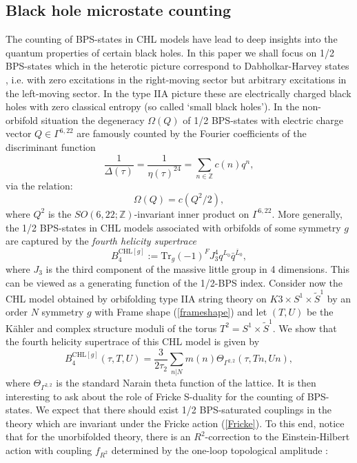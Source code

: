 \documentclass[a4paper,11pt]{article}
\numberwithin{equation}{section}
\def\be{\begin{equation}}
\def\ee{\end{equation}}
\begin{document}
\subsection{Black hole microstate counting}
The counting of BPS-states in CHL models have lead to deep insights into the quantum properties of certain black holes. In this paper we shall focus on 1/2 BPS-states which in the heterotic picture correspond to Dabholkar-Harvey states \cite{Dabholkar:1990yf}, i.e. with zero excitations in the right-moving sector but arbitrary excitations in the left-moving sector. In the type IIA picture these are electrically charged  black holes with zero classical entropy (so called `small black holes'). In the non-orbifold situation the degeneracy $\Omega(Q)$ of 1/2 BPS-states with electric charge vector $Q\in \Gamma^{6,22}$ are famously counted by the Fourier coefficients of the discriminant function 
\be
\frac{1}{\Delta(\tau)}=\frac{1}{\eta(\tau)^{24}} = \sum_{n\in \mathbb{Z}} c(n) q^{n},
\ee
via the relation:
\be
\Omega(Q) = c(Q^2/2),
\label{1/2BPS}
\ee
where $Q^2$ is the $SO(6,22;\mathbb{Z})$-invariant inner product on $\Gamma^{6,22}$. More generally, the 1/2 BPS-states in CHL models associated with orbifolds of some symmetry $g$ are captured by the \emph{fourth helicity supertrace} \cite{Kiritsis:1997hj}
\be
B^{\text{CHL}[g]}_4:= \text{Tr}_g(-1)^F J_3^4 q^{L_0} \bar{q}^{\bar{L}_0},
\ee
where $J_3$ is the third component of the massive little group in 4 dimensions. This can be viewed as a generating function of the 1/2-BPS index. 
Consider now the CHL model obtained by orbifolding type IIA string theory on $K3\times S^1\times \tilde{S}^1$ by an order $N$ symmetry $g$ with Frame shape (\ref{frameshape}) and let $(T,U)$ be the 
K\"ahler and complex structure moduli of the torus $T^2=S^1\times \tilde{S}^1$. We show that the fourth helicity supertrace of this CHL model is given by
\be
B^{\text{CHL}[g]}_{4}(\tau, T, U)=\frac{3}{2\tau_2}\sum_{n|N}m(n) \Theta_{\Gamma^{2,2}}(\tau,Tn, Un),
\ee
where $\Theta_{\Gamma^{2,2}}$ is the standard Narain theta function of the lattice. It is then interesting to ask about the role of Fricke S-duality for the counting of BPS-states. We expect that there should exist 1/2 BPS-saturated couplings in the theory which are invariant under the Fricke action (\ref{Fricke}). To this end, notice that for the unorbifolded theory, there is an $R^2$-correction to the Einstein-Hilbert action with coupling $f_{R^2}$ determined by the one-loop topological amplitude \cite{Harvey:1996ir}:
\end{document}
